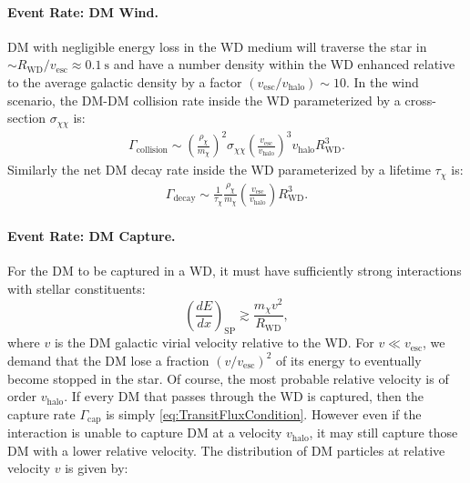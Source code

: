 \documentclass[preprintnumbers,amsmath,amssymb,prd,superscriptaddress]{revtex4}
\def\r{\right)}
\def\l{\left(}
\begin{document}
\paragraph{Event Rate: DM Wind.}
DM with negligible energy loss in the WD medium will traverse the star in $\sim R_\text{WD}/v_\text{esc} \approx 0.1 ~\text{s}$ and have a number density within the WD enhanced relative to the average galactic density by a factor $(v_\text{esc}/v_\text{halo}) \sim 10$.
In the wind scenario, the DM-DM collision rate inside the WD parameterized by a cross-section $\sigma_{\chi \chi}$ is:
\begin{align}
  \Gamma_\text{collision}
  \sim \l \frac{\rho_\chi}{m_\chi} \r^2 \sigma_{\chi \chi} \l \frac{v_\text{esc}}{v_\text{halo}}\r^3 v_\text{halo} R_\text{WD}^3.
  \label{eq:collisionDM}
\end{align}
Similarly the net DM decay rate inside the WD parameterized by a lifetime $\tau_\chi$ is:
\begin{align}
 \Gamma_\text{decay}
  \sim \frac{1}{\tau_\chi} \frac{\rho_{\chi}}{m_\chi} \l \frac{v_\text{esc}}{v_\text{halo}}\r R_\text{WD}^3.
  \label{eq:decayDM}
\end{align}

\paragraph{Event Rate: DM Capture.}
For the DM to be captured in a WD, it must have sufficiently strong interactions with stellar constituents:
\begin{equation}
\label{eq:capture}
\left( \frac{d E}{d x} \right)_\text{SP} \gtrsim \frac{m_\chi v^2}{R_\text{WD}},
\end{equation}
where $v$ is the DM galactic virial velocity relative to the WD.  
For $v \ll v_\text{esc}$, we demand that the DM lose a fraction $(v/v_\text{esc})^2$ of its energy to eventually become stopped in the star. 
Of course, the most probable relative velocity is of order $v_\text{halo}$.
If every DM that passes through the WD is captured, then the capture rate $\Gamma_\text{cap}$ is simply \eqref{eq:TransitFluxCondition}. 
However even if the interaction is unable to capture DM at a velocity $v_\text{halo}$, it may still capture those DM with a lower relative velocity. 
The distribution of DM particles at relative velocity $v$ is given by:
\end{document}
